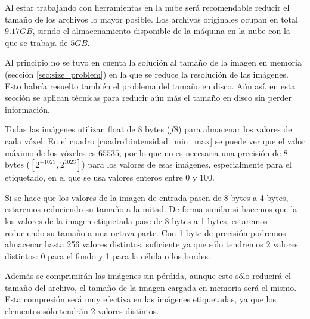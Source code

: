 Al estar trabajando con herramientas en la nube será recomendable reducir el tamaño de los archivos lo mayor posible. Los archivos originales ocupan en total $9.17GB$, siendo el almacenamiento disponible de la máquina en la nube con la que se trabaja de $5GB$.

Al principio no se tuvo en cuenta la solución al tamaño de la imagen en memoria (sección \ref{sec:size_problem}) en la que se reduce la resolución de las imágenes. Esto habría resuelto también el problema del tamaño en disco. Aún así, en esta sección se aplican técnicas para reducir aún más el tamaño en disco sin perder información.

Todas las imágenes utilizan float de 8 bytes ($f8$) para almacenar los valores de cada vóxel. En el cuadro \ref{cuadro1:intensidad_min_max} se puede ver que el valor máximo de los vóxeles es $65535$, por lo que no es necesaria una precisión de 8 bytes ($[2^{-1023}, 2^{1023}]$) para los valores de esas imágenes, especialmente para el etiquetado, en el que se usa valores enteros entre $0$ y $100$.


Si se hace que los valores de la imagen de entrada pasen de 8 bytes a 4 bytes, estaremos reduciendo su tamaño a la mitad. De forma similar si hacemos que la los valores de la imagen etiquetada pase de 8 bytes a 1 bytes, estaremos reduciendo su tamaño a una octava parte. Con 1 byte de precisión podremos almacenar hasta 256 valores distintos, suficiente ya que sólo tendremos 2 valores distintos: 0 para el fondo y 1 para la célula o los bordes. 

Además se comprimirán las imágenes sin pérdida, aunque esto sólo reducirá el tamaño del archivo, el tamaño de la imagen cargada en memoria será el mismo. Esta compresión será muy efectiva en las imágenes etiquetadas, ya que los elementos sólo tendrán 2 valores distintos. 

